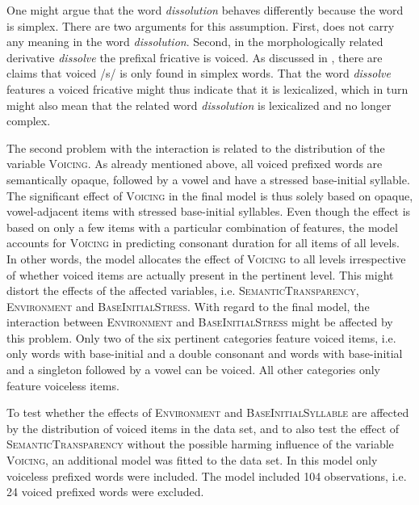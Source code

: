 One might argue that the word \textit{dissolution} behaves differently because the word is simplex. There are two arguments for this assumption. First,  does not carry any meaning in the word \textit{dissolution}. Second, in the morphologically related derivative \textit{dissolve} the prefixal fricative is voiced. As discussed in , there are claims that voiced /s/ is only found in simplex words. That the word \textit{dissolve} features a voiced fricative might thus indicate that it is lexicalized, which in turn might also mean that the related word \textit{dissolution} is lexicalized and no longer complex.

The second problem with the interaction  
is related to the distribution of the variable \textsc{Voicing}. 
 As already mentioned above, all voiced prefixed words are semantically opaque, followed by a vowel and have a stressed base-initial syllable. The significant effect of \textsc{Voicing} in the final model is thus solely based on opaque, vowel-adjacent items with stressed base-initial syllables. Even though the effect is based on only a few items with a particular combination of features, the model accounts for \textsc{Voicing} in predicting consonant duration for all items of all levels. In other words, the model allocates the effect of \textsc{Voicing} to all levels irrespective of whether voiced items are actually present in the pertinent level. This might distort the effects of the affected variables, i.e. \textsc{SemanticTransparency}, \textsc{Environment} and \textsc{BaseInitialStress}. 
  With regard to the final model, the interaction between \textsc{Environment} and \textsc{BaseInitialStress} might be affected by this problem.
  Only two of the six pertinent categories feature voiced items, i.e. only words with base-initial  and a double consonant and words with base-initial  and a singleton followed by a vowel can be voiced. All other categories only feature voiceless items.
  
  
  
  To test whether the effects of \textsc{Environment} and \textsc{BaseInitialSyllable} are affected by the distribution of voiced items in the data set, and to also test the effect of \textsc{SemanticTransparency} without the possible harming influence of the variable \textsc{Voicing}, an additional model was fitted to the data set. In this model only voiceless prefixed words were included. The model included 104 observations, i.e. 24 voiced prefixed words were excluded. 
  
